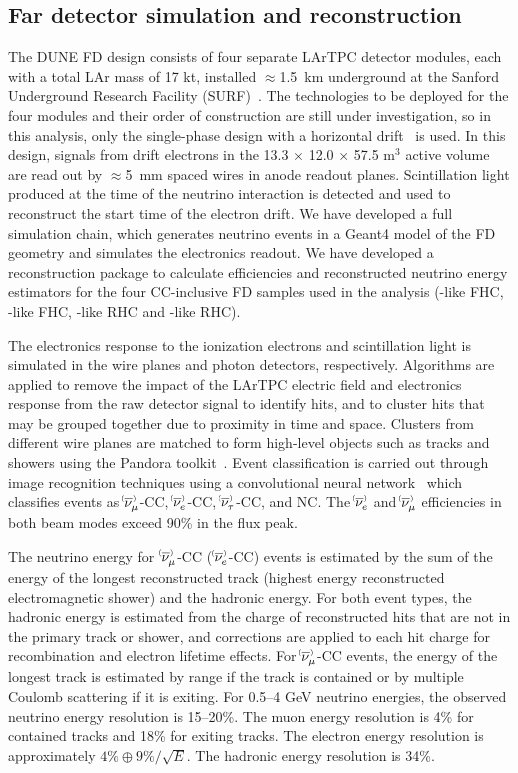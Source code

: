 \subsection{Far detector simulation and reconstruction}
\label{sec:fd}
The DUNE FD design consists of four separate LArTPC detector modules, each with a total LAr mass of 17 kt, installed $\approx$1.5~km underground at the Sanford Underground Research Facility (SURF)~\cite{Abi:2018dnh}. The technologies to be deployed for the four modules and their order of construction are still under investigation, so in this analysis, only the single-phase design with a horizontal drift~\cite{Abi:2020loh} is used. In this design, signals from drift electrons in the 13.3 $\times$ 12.0 $\times$ 57.5 m$^{3}$ active volume are read out by $\approx$5~mm spaced wires in anode readout planes. Scintillation light produced at the time of the neutrino interaction is detected and used to reconstruct the start time of the electron drift. We have developed a full simulation chain, which generates neutrino events in a Geant4 model of the FD geometry and simulates the electronics readout. We have developed a reconstruction package to calculate efficiencies and reconstructed neutrino energy estimators for the four CC-inclusive FD samples used in the analysis (\numu-like FHC, \nue-like FHC, \anumu-like RHC and \anue-like RHC).

The electronics response to the ionization electrons and scintillation light is simulated in the wire planes and photon detectors, respectively. Algorithms are applied to remove the impact of the LArTPC electric field and electronics response from the raw detector signal to identify hits, and to cluster hits that may be grouped together due to proximity in time and space. Clusters from different wire planes are matched to form high-level objects such as tracks and showers using the Pandora toolkit~\cite{Marshall:2015rfa,Acciarri:2017hat}. Event classification is carried out through image recognition techniques using a convolutional neural network~\cite{cvn_paper} which classifies events as $\nu^{\bracketbar}_{\mu}$-CC, $\nu^{\bracketbar}_{e}$-CC, $\nu^{\bracketbar}_{\tau}$-CC, and NC. The $\nue^{\bracketbar}$ and $\numu^{\bracketbar}$ efficiencies in both beam modes exceed 90\% in the flux peak.

The neutrino energy for $\,\nu^{\bracketbar}_{\mu}$-CC ($\,\nu^{\bracketbar}_{e}$-CC) events is estimated by the sum of the energy of the longest reconstructed track (highest energy reconstructed electromagnetic shower) and the hadronic energy. For both event types, the hadronic energy is estimated from the charge of reconstructed hits that are not in the primary track or shower, and corrections are applied to each hit charge for recombination and electron lifetime effects. For $\nu^{\bracketbar}_{\mu}$-CC events, the energy of the longest track is estimated by range if the track is contained or by multiple Coulomb scattering if it is exiting. For 0.5--4 GeV neutrino energies, the observed neutrino energy resolution is 15--20\%. The muon energy resolution is 4\% for contained tracks and 18\% for exiting tracks. The electron energy resolution is approximately $4\% \oplus 9\%/\sqrt{E}$. The hadronic energy resolution is 34\%.

